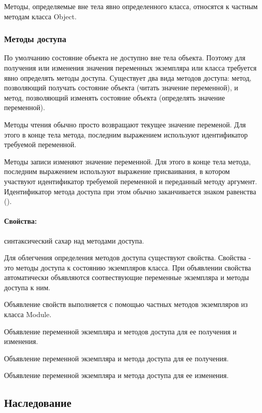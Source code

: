 Методы, определяемые вне тела явно определенного класса, относятся к частным методам класса Object.

\subsubsection*{Методы доступа}

По умолчанию состояние объекта не доступно вне тела объекта. Поэтому для получения или изменения значения переменных экземпляра или класса требуется явно определять методы доступа. Существует два вида методов доступа: метод, позволяющий получать состояние объекта (читать значение переменной), и метод, позволяющий изменять состояние объекта (определять значение переменной).

Методы чтения обычно просто возвращают текущее значение переменой. Для этого в конце тела метода, последним выражением используют идентификатор требуемой переменной.

Методы записи изменяют значение переменной. Для этого в конце тела метода, последним выражением используют выражение присваивания, в котором участвуют идентификатор требуемой переменной и переданный методу аргумент. Идентификатор метода доступа при этом обычно заканчивается знаком равенства (\mono{=}).

\paragraph*{Свойства:} синтаксический сахар над методами доступа.

Для облегчения определения методов доступа существуют свойства. Свойства - это методы доступа к состоянию экземпляров класса. При объявлении свойства автоматически объявляются соотвествующие переменные экземпляра и методы доступа к ним.

Объявление свойств выполняется с помощью частных методов экземпляров из класса Module. 
\begin{methodlist}
  Объявление переменной экземпляра и методов доступа для ее получения и изменения.

  Объявление переменной экземпляра и метода доступа для ее получения.

  Объявление переменной экземпляра и метода доступа для ее изменения.
\end{methodlist}

\subsection{Наследование}

